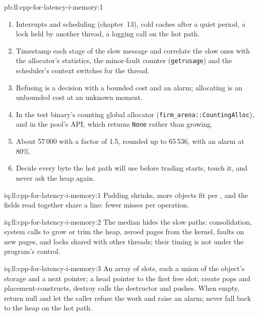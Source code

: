 \begin{solution}{pb:ll:cpp-for-latency-i-memory:1}
\begin{enumerate}
that allocates fails the build.
\item Interrupts and scheduling (chapter~13), cold caches after a quiet period, a lock held by another thread, a logging
call on the hot path.
\item Timestamp each stage of the slow message and correlate the slow ones with the allocator's statistics, the minor-fault
counter (\texttt{getrusage}) and the scheduler's context switches for the thread.
\item Refusing is a decision with a bounded cost and an alarm; allocating is an unbounded cost at an unknown moment.
\item In the test binary's counting global allocator (\texttt{firm\_arena::CountingAlloc}), and in the pool's API, which
returns \texttt{None} rather than growing.
\item About 57\,000 with a factor of 1.5, rounded up to 65\,536, with an alarm at 80\%.
\item Decide every byte the hot path will use before trading starts, touch it, and never ask the heap again.
\end{enumerate}
\end{solution}

\begin{solution}{iq:ll:cpp-for-latency-i-memory:1}
Padding shrinks, more objects fit per , and the fields read together share a line: fewer misses per operation.
\end{solution}

\begin{solution}{iq:ll:cpp-for-latency-i-memory:2}
The median hides the slow paths: consolidation, system calls to grow or trim the heap, zeroed pages from the kernel, faults
on new pages, and locks shared with other threads; their timing is not under the program's control.
\end{solution}

\begin{solution}{iq:ll:cpp-for-latency-i-memory:3}
An array of slots, each a union of the object's storage and a next pointer; a head pointer to the first free slot; create
pops and placement-constructs, destroy calls the destructor and pushes. When empty, return null and let the caller refuse
the work and raise an alarm; never fall back to the heap on the hot path.
\end{solution}


